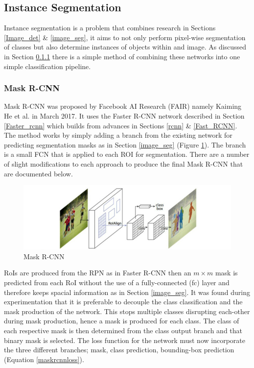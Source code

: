 \documentclass[a4paper,11pt,notitlepage]{article}
\begin{document}
\subsection{Instance Segmentation}
Instance segmentation is a problem that combines research in Sections \ref{Image_det} \& \ref{image_seg}, it aims to not only perform pixel-wise segmentation of classes but also determine instances of objects within and image. As discussed in Section \ref{mask_rcnn} there is a simple method of combining these networks into one simple classification pipeline.
\subsubsection{Mask R-CNN} \label{mask_rcnn}
Mask R-CNN was proposed by Facebook AI Research (FAIR) namely Kaiming He et al. in March 2017. It uses the Faster R-CNN network described in Section \ref{Faster_rcnn} which builds from advances in Sections \ref{rcnn}  \& \ref{Fast_RCNN}. The method works by simply adding a branch from the existing network for predicting segmentation masks as in Section \ref{image_seg} (Figure \ref{Mask_rcnn_arch}). The branch is a small FCN that is applied to each ROI for segmentation. There are a number of slight modifications to each approach to produce the final Mask R-CNN that are documented below.


\noindent \begin{figure}[h!]
\includegraphics[width = 1.0\hsize]{./figures/mask_arch.jpg}
\caption{Mask R-CNN \cite{DBLP:journals/corr/HeGDG17}}
\label{Mask_rcnn_arch}
\end{figure}
RoIs are produced from the RPN as in Faster R-CNN \cite{DBLP:journals/corr/RenHG015} then an $m \times m$ mask is predicted from each RoI without the use of a fully-connected (fc) layer and therefore keeps spacial information as in Section \ref{image_seg}. It was found during experimentation that it is preferable to decouple the class classification and the mask production of the network. This stops multiple classes disrupting each-other during mask production, hence a mask is produced for each class. The class of each respective mask is then determined from the class output branch and that binary mask is selected. 
\newline \newline
The loss function for the network must now incorporate the three different branches; mask, class prediction, bounding-box prediction (Equation \ref{maskrcnnloss}). 
\end{document}

